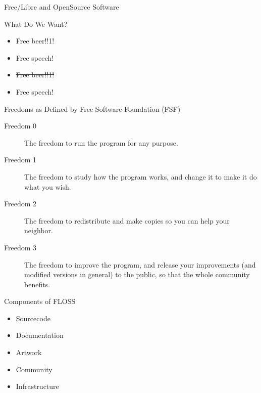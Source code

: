 \documentclass{beamer}
\begin{document}
\begin{frame}{Free/Libre and OpenSource Software}
    \begin{block}{What Do We Want?}
        {
            \begin{itemize}
                \item Free beer!!1!
                \item<2-> Free speech!
            \end{itemize}
        }

        {
            \begin{itemize}
                \item \sout{Free beer!!1!}
                \item Free speech!
            \end{itemize}
        }
    \end{block}

    {
        \begin{block}{Freedoms as Defined by Free Software Foundation (FSF)}
            \begin{description}
                \item[Freedom 0] The freedom to run the program for any
                    purpose.
                \item[Freedom 1] The freedom to study how the program
                    works, and change it to make it do what you wish.
                \item[Freedom 2] The freedom to redistribute and make
                    copies so you can help your neighbor.
                \item[Freedom 3] The freedom to improve the program, and
                    release your improvements (and modified versions in
                    general) to the public, so that the whole community
                    benefits.
            \end{description}
        \end{block}
    }
\end{frame}

\begin{frame}{Components of FLOSS}
    \begin{itemize}
        \item Sourcecode
        \item Documentation
        \item Artwork
        \item Community
        \item Infrastructure
    \end{itemize}
\end{frame}
\end{document}
